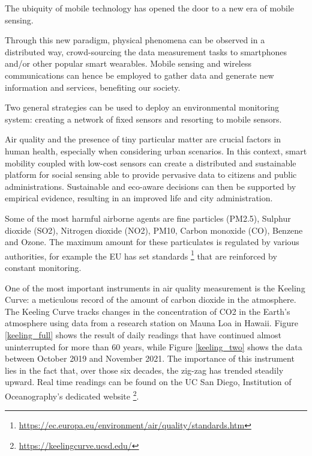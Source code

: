 		The ubiquity of mobile technology has opened the door to a new era of mobile sensing. 

		Through this new paradigm, physical phenomena can be observed in a distributed way, crowd-sourcing the data measurement tasks to smartphones and/or other popular smart wearables. Mobile sensing and wireless communications can hence be employed to gather data and generate new information and services, benefiting our society.
		
		Two general strategies can be used to deploy an environmental monitoring system: creating a network of fixed sensors	and resorting to mobile sensors.
			
		Air quality and the presence of tiny particular matter are crucial factors in human health, especially when considering urban scenarios. 
		In this context, smart mobility coupled with low-cost sensors can create a distributed and sustainable platform for social sensing able to provide pervasive data to citizens and public administrations. 
		Sustainable and eco-aware decisions can then be supported by empirical evidence, resulting in an improved life and city administration. 
		
		Some of the most harmful airborne agents are fine particles (PM2.5), Sulphur dioxide (SO2), Nitrogen dioxide (NO2), PM10, Carbon monoxide (CO), Benzene and Ozone.
		The maximum amount for these particulates is regulated by various authorities, for example the EU has set standards \footnote{\url{https://ec.europa.eu/environment/air/quality/standards.htm}} that are reinforced by constant monitoring.
				
		One of the most important instruments in air quality measurement is the Keeling Curve: a meticulous record of the amount of carbon dioxide in the atmosphere.
		The Keeling Curve tracks changes in the concentration of CO2 in the Earth's atmosphere using data from a research station on Mauna Loa in Hawaii.
		Figure \ref{keeling_full} shows the result of daily readings that have continued almost uninterrupted for more than 60 years, while Figure \ref{keeling_two} shows the data between October 2019 and November 2021.
		The importance of this instrument lies in the fact that, over those six decades, the zig-zag has trended steadily upward. 
		Real time readings can be found on the UC San Diego, Institution of Oceanography's dedicated website \footnote{\url{https://keelingcurve.ucsd.edu/}}.
	
